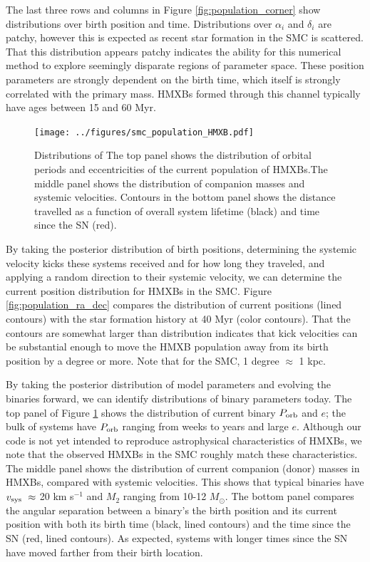 \documentclass[12pt, preprint]{aastex}
\newcommand{\Msun}{\ifmmode {M_{\odot}}\else${M_{\odot}}$\fi}
\begin{document}
The last three rows and columns in Figure \ref{fig:population_corner} show distributions over birth position and time. Distributions over $\alpha_i$ and $\delta_i$ are patchy, however this is expected as recent star formation in the SMC is scattered. That this distribution appears patchy indicates the ability for this numerical method to explore seemingly disparate regions of parameter space. These position parameters are strongly dependent on the birth time, which itself is strongly correlated with the primary mass. HMXBs formed through this channel typically have ages between 15 and 60 Myr.


\begin{figure}[h!]
\begin{center}
\texttt{[image: ../figures/smc\_population\_HMXB.pdf]}
\caption{ Distributions of The top panel shows the distribution of orbital periods and eccentricities of the current population of HMXBs.The middle panel shows the distribution of companion masses and systemic velocities. Contours in the bottom panel shows the distance travelled as a function of  overall system lifetime (black) and time since the SN (red). }
\label{fig:smc_population_HMXB}
\end{center}
\end{figure}


By taking the posterior distribution of birth positions, determining the systemic velocity kicks these systems received and for how long they traveled, and applying a random direction to their systemic velocity, we can determine the current position distribution for HMXBs in the SMC. Figure \ref{fig:population_ra_dec} compares the distribution of current positions (lined contours) with the star formation history at 40 Myr (color contours). That the contours are somewhat larger than distribution indicates that kick velocities can be substantial enough to move the HMXB population away from its birth position by a degree or more. Note that for the SMC, 1 degree $\approx$ 1 kpc.


By taking the posterior distribution of model parameters and evolving the binaries forward, we can identify distributions of binary parameters today. The top panel of Figure \ref{fig:smc_population_HMXB} shows the distribution of current binary $P_{\rm orb}$ and $e$; the bulk of systems have $P_{\rm orb}$ ranging from weeks to years and large $e$. Although our code is not yet intended to reproduce astrophysical characteristics of HMXBs, we note that the observed HMXBs in the SMC roughly match these characteristics. The middle panel shows the distribution of current companion (donor) masses in HMXBs, compared with systemic velocities. This shows that typical binaries have $v_{\rm sys}\ \approx$ 20 km s$^{-1}$ and $M_2$ ranging from 10-12 \Msun. The bottom panel compares the angular separation between a binary's the birth position and its current position with both its birth time (black, lined contours) and the time since the SN (red, lined contours). As expected, systems with longer times since the SN have moved farther from their birth location. 
\end{document}
